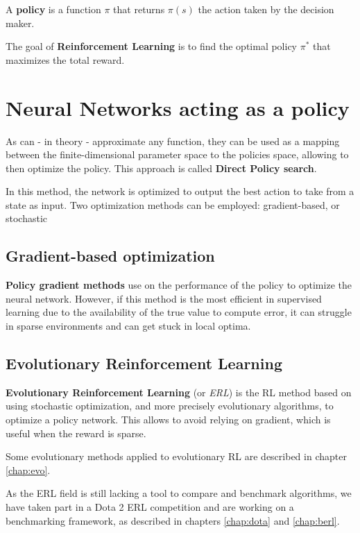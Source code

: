 A \textbf{policy} is a function $\pi$ that returns $\pi(s)$ the action taken by the decision maker. 

The goal of \textbf{Reinforcement Learning} is to find the optimal policy $\pi^*$ that maximizes the total reward. 

\section{Neural Networks acting as a policy}

As  can - in theory - approximate any function, they can be used as a mapping between the finite-dimensional parameter space to the policies space, allowing to then optimize the policy. This approach is called \textbf{Direct Policy search}. 

In this method, the network is optimized to output the best action to take from a state as input. Two optimization methods can be employed: gradient-based, or stochastic

\subsection{Gradient-based optimization}

\textbf{Policy gradient methods} use  on the performance of the policy to optimize the neural network. However, if this method is the most efficient in supervised learning due to the availability of the true value to compute error, it can struggle in sparse environments and can get stuck in local optima. 

\subsection{Evolutionary Reinforcement Learning}

\textbf{Evolutionary Reinforcement Learning} (or \textit{ERL}) is the RL method based on using stochastic optimization, and more precisely evolutionary algorithms, to optimize a policy network. This allows to avoid relying on gradient, which is useful when the reward is sparse.

Some evolutionary methods applied to evolutionary RL are described in chapter \ref{chap:evo}.

As the ERL field is still lacking a tool to compare and benchmark algorithms, we have taken part in a Dota 2 ERL competition and are working on a benchmarking framework, as described in chapters \ref{chap:dota} and \ref{chap:berl}.

